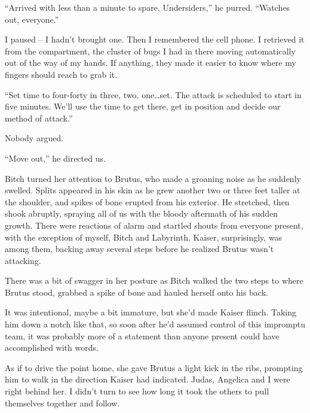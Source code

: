 ``Arrived with less than a minute to spare, Undersiders,'' he purred.  ``Watches out, everyone.''



I paused – I hadn't brought one.  Then I remembered the cell phone.  I retrieved it from the compartment, the cluster of bugs I had in there moving automatically out of the way of my hands.  If anything, they made it easier to know where my fingers should reach to grab it.



``Set time to four-forty in three, two, one\ldots set.  The attack is scheduled to start in five minutes.  We'll use the time to get there, get in position and decide our method of attack.''



Nobody argued.



``Move out,'' he directed us.



Bitch turned her attention to Brutus, who made a groaning noise as he suddenly swelled.  Splits appeared in his skin as he grew another two or three feet taller at the shoulder, and spikes of bone erupted from his exterior.  He stretched, then shook abruptly, spraying all of us with the bloody aftermath of his sudden growth.  There were reactions of alarm and startled shouts from everyone present, with the exception of myself, Bitch and Labyrinth.  Kaiser, surprisingly, was among them, backing away several steps before he realized Brutus wasn't attacking.



There was a bit of swagger in her posture as Bitch walked the two steps to where Brutus stood, grabbed a spike of bone and hauled herself onto his back.



It was intentional, maybe a bit immature, but she'd made Kaiser flinch.  Taking him down a notch like that, so soon after he'd assumed control of this impromptu team, it was probably more of a statement than anyone present could have accomplished with words.



As if to drive the point home, she gave Brutus a light kick in the ribs, prompting him to walk in the direction Kaiser had indicated.  Judas, Angelica and I were right behind her.  I didn't turn to see how long it took the others to pull themselves together and follow.






